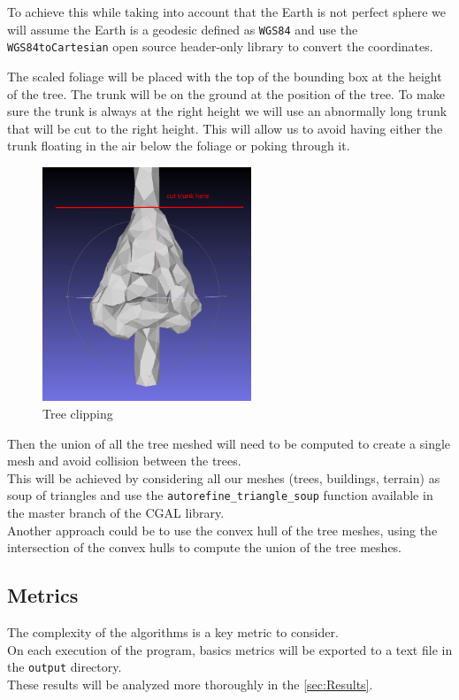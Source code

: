 \documentclass[12pt]{article}
\begin{document}
To achieve this while taking into account that the Earth is not perfect sphere
we will assume the Earth is a geodesic defined as \texttt{WGS84}\cite{wgs84} and use
the \texttt{WGS84toCartesian}\cite{wgs84_to_cartesian} open source header-only
library to convert the coordinates.

The scaled foliage will be placed with the top of the bounding box at the
height of the tree. The trunk will be on the ground at the position of the tree.
To make sure the trunk is always at the right height we will use an abnormally
long trunk that will be cut to the right height. This will allow us to avoid having 
either the trunk floating in the air below the foliage or poking through it.

\begin{figure}[H]
    \centering
    \includegraphics[height=7cm]{images/trunk_cut.png}
    \caption{Tree clipping}
\end{figure}

Then the union of all the tree meshed will need to be computed to create a single mesh
and avoid collision between the trees. \\
This will be achieved by considering all our meshes (trees, buildings, terrain) as
soup of triangles and  use the \texttt{autorefine\_triangle\_soup}\cite{auto-refine-triangle-soup}
function available in the master branch of the CGAL library. \\
Another approach could be to use the convex hull of the tree meshes, using the
intersection of the convex hulls to compute the union of the tree meshes.

\subsection{Metrics}
The complexity of the algorithms is a key metric to consider. \\
On each execution of the program, basics metrics will be exported to a text file in
the \texttt{output} directory. \\
These results will be analyzed more thoroughly in the \autoref{sec:Results}.
\end{document}
